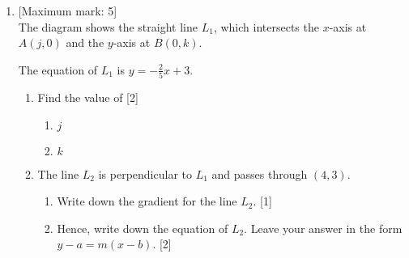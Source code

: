 \documentclass[12pt, twoside]{article}
\begin{document}
\begin{enumerate}
\newpage 
    \item {[Maximum mark: 5]} \\[0.3cm]
    The diagram shows the straight line $L_1$, which intersects the $x$-axis at $A(j, 0)$ and the $y$-axis at $B(0,k)$.
        \begin{center}
        \end{center}
        The equation of $L_1$ is $\displaystyle y=-\frac{2}{5}x+3$.
        \begin{enumerate}%
            \item Find the value of \hfill [2]
                \begin{enumerate}
                    \item $j$
                    \item $k$
                \end{enumerate}
            \item The line $L_2$ is perpendicular to $L_1$ and passes through $(4,3)$.
                \begin{enumerate}
                    \item Write down the gradient for the line $L_2$. \hfill [1]
                    \item Hence, write down the equation of $L_2$. Leave your answer in the form \\ $y-a=m(x-b)$. \hfill [2]
                \end{enumerate}
        \end{enumerate}


\end{enumerate}
\end{document}
